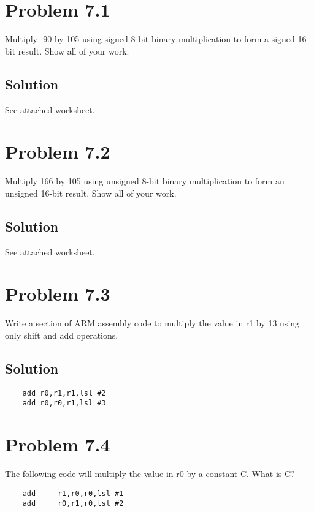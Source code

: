\documentclass[letterpaper,11pt]{texMemo} %
\begin{document}
\maketitle %


\section*{Problem 7.1}
Multiply -90 by 105 using signed 8-bit binary multiplication to form a signed 16-bit
result. Show all of your work.
\subsection*{Solution}
See attached worksheet.

\section*{Problem 7.2}
Multiply 166 by 105 using unsigned 8-bit binary multiplication to form an unsigned 16-bit
result. Show all of your work.
\subsection*{Solution}
See attached worksheet.

\section*{Problem 7.3}
Write a section of ARM assembly code to multiply the value in r1 by 13 using only shift
and add operations.
\subsection*{Solution}
\begin{lstlisting}
    add r0,r1,r1,lsl #2
    add r0,r0,r1,lsl #3
\end{lstlisting}

\newpage

\section*{Problem 7.4}
The following code will multiply the value in r0 by a constant C. What is C?
\begin{lstlisting}
    add     r1,r0,r0,lsl #1
    add     r0,r1,r0,lsl #2
\end{lstlisting}
\end{document}
